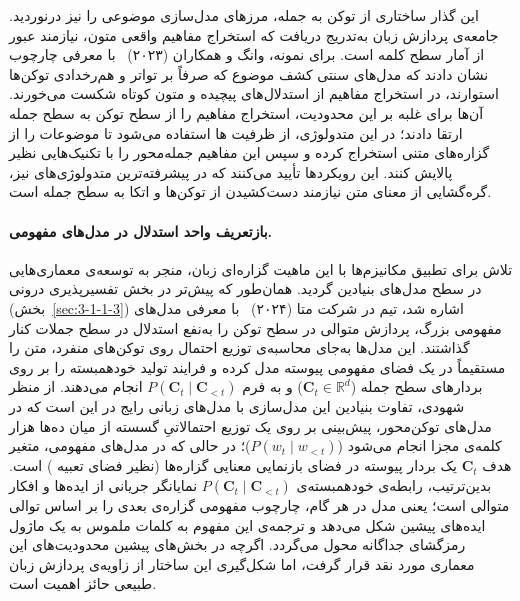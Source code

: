 این گذار ساختاری از توکن به جمله، مرزهای مدل‌سازی موضوعی را نیز درنوردید. جامعه‌ی پردازش زبان به‌تدریج دریافت که استخراج مفاهیم واقعی متون، نیازمند عبور از آمار سطح کلمه است. برای نمونه، وانگ و همکاران (۲۰۲۳)~\cite{wang2023prompting} با معرفی چارچوب  نشان دادند که مدل‌های سنتی کشف موضوع که صرفاً بر تواتر و هم‌رخدادی توکن‌ها استوارند، در استخراج مفاهیم از استدلال‌های پیچیده و متون کوتاه شکست می‌خورند. آن‌ها برای غلبه بر این محدودیت، استخراج مفاهیم را از سطح توکن به سطح جمله ارتقا دادند؛ در این متدولوژی، از ظرفیت ها استفاده می‌شود تا موضوعات را از گزاره‌های متنی استخراج کرده و سپس این مفاهیم جمله‌محور را با تکنیک‌هایی نظیر  پالایش کنند. این رویکردها تأیید می‌کنند که در پیشرفته‌ترین متدولوژی‌های  نیز، گره‌گشایی از معنای متن نیازمند دست‌کشیدن از توکن‌ها و اتکا به سطح جمله است.


\paragraph{بازتعریف واحد استدلال در مدل‌های مفهومی.}

تلاش برای تطبیق مکانیزم‌ها با این ماهیت گزاره‌ای زبان، منجر به توسعه‌ی معماری‌هایی در سطح مدل‌های بنیادین گردید. همان‌طور که پیش‌تر در بخش تفسیرپذیری درونی (بخش~\ref{sec:3-1-1-3}) اشاره شد، تیم  در شرکت متا (۲۰۲۴)~\cite{lcmteam2024lcm} با معرفی مدل‌های مفهومی بزرگ، پردازش متوالی در سطح توکن را به‌نفع استدلال در سطح جملات کنار گذاشتند. این مدل‌ها به‌جای محاسبه‌ی توزیع احتمال روی توکن‌های منفرد، متن را مستقیماً در یک فضای مفهومی پیوسته مدل کرده و فرایند تولید خودهمبسته را بر روی بردارهای سطح جمله ($\mathbf{C}_t \in \mathbb{R}^d$) و به فرم $P(\mathbf{C}_t \mid \mathbf{C}_{<t})$ انجام می‌دهند. از منظر شهودی، تفاوت بنیادین این مدل‌سازی با مدل‌های زبانی رایج در این است که در مدل‌های توکن‌محور، پیش‌بینی بر روی یک توزیع احتمالاتیِ گسسته از میان ده‌ها هزار کلمه‌ی مجزا انجام می‌شود ($P(w_t \mid w_{<t})$)؛ در حالی که در مدل‌های مفهومی، متغیر هدف $\mathbf{C}_t$ یک بردار پیوسته در فضای بازنمایی معنایی گزاره‌ها (نظیر فضای تعبیه ) است. بدین‌ترتیب، رابطه‌ی خودهمبسته‌ی $P(\mathbf{C}_t \mid \mathbf{C}_{<t})$ نمایانگر جریانی از ایده‌ها و افکار متوالی است؛ یعنی مدل در هر گام، چارچوب مفهومی گزاره‌ی بعدی را بر اساس توالی ایده‌های پیشین شکل می‌دهد و ترجمه‌ی این مفهوم به کلمات ملموس به یک ماژول رمزگشای جداگانه محول می‌گردد. اگرچه در بخش‌های پیشین محدودیت‌های این معماری مورد نقد قرار گرفت، اما شکل‌گیری این ساختار از زاویه‌ی پردازش زبان طبیعی حائز اهمیت است.

